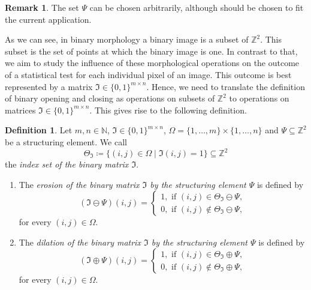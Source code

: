 \documentclass[a4paper,12pt]{article}
\theoremstyle{plain}
\theoremstyle{definition}
\newtheorem{definition}[theorem]{Definition}
\newtheorem{remark}[theorem]{Remark}
\begin{document}
\begin{remark}
	The set $\Psi$ can be chosen arbitrarily, although should be chosen to fit the current application.
\end{remark}

As we can see, in binary morphology a binary image is a subset of $\mathbb{Z}^2$. This subset is the set of points at which the binary image is one. In contrast to that, we aim to study the influence of these morphological operations on the outcome of a statistical test for each individual pixel of an image. This outcome is best represented by a matrix $\mathfrak{I} \in \{ 0, 1 \}^{m \times n}$. Hence, we need to translate the definition of binary opening and closing as operations on subsets of $\mathbb{Z}^2$ to operations on matrices $\mathfrak{I} \in \{ 0, 1 \}^{m \times n}$. This gives rise to the following definition.

\begin{definition}
	Let $m, n \in \mathbb{N}$, $\mathfrak{I} \in \{ 0, 1 \}^{m \times n}$, $\Omega = \{ 1, \dots, m \} \times \{ 1, \dots, n \}$ and $\Psi \subseteq \mathbb{Z}^2$ be a structuring element. We call
	\begin{equation*}
		\Theta_\mathfrak{I} \coloneqq \{ (i, j) \in \Omega \mid \mathfrak{I}(i, j) = 1 \} \subseteq \mathbb{Z}^2
	\end{equation*}
	the \emph{index set of the binary matrix $\mathfrak{I}$}.
	\begin{enumerate}
		\item The \emph{erosion of the binary matrix $\mathfrak{I}$ by the structuring element $\Psi$} is defined by
		\begin{equation}
			(\mathfrak{I} \ominus \Psi)(i, j) =
			\begin{cases}
				1, \textrm{ if } (i, j) \in \Theta_\mathfrak{I} \ominus \Psi, \\
				0, \textrm{ if } (i, j) \notin \Theta_\mathfrak{I} \ominus \Psi,
			\end{cases}
		\end{equation}
		for every $(i, j) \in \Omega$.
		\item The \emph{dilation of the binary matrix $\mathfrak{I}$ by the structuring element $\Psi$} is defined by
		\begin{equation}
			(\mathfrak{I} \oplus \Psi)(i, j) =
			\begin{cases}
				1, \textrm{ if } (i, j) \in \Theta_\mathfrak{I} \oplus \Psi, \\
				0, \textrm{ if } (i, j) \notin \Theta_\mathfrak{I} \oplus \Psi,
			\end{cases}
		\end{equation}
		for every $(i, j) \in \Omega$.
	\end{enumerate}
\end{definition}
\end{document}
